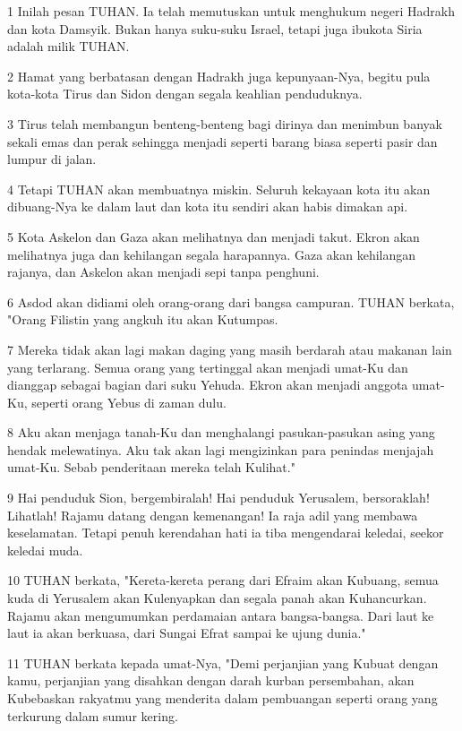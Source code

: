 \par 1 Inilah pesan TUHAN. Ia telah memutuskan untuk menghukum negeri Hadrakh dan kota Damsyik. Bukan hanya suku-suku Israel, tetapi juga ibukota Siria adalah milik TUHAN.
\par 2 Hamat yang berbatasan dengan Hadrakh juga kepunyaan-Nya, begitu pula kota-kota Tirus dan Sidon dengan segala keahlian penduduknya.
\par 3 Tirus telah membangun benteng-benteng bagi dirinya dan menimbun banyak sekali emas dan perak sehingga menjadi seperti barang biasa seperti pasir dan lumpur di jalan.
\par 4 Tetapi TUHAN akan membuatnya miskin. Seluruh kekayaan kota itu akan dibuang-Nya ke dalam laut dan kota itu sendiri akan habis dimakan api.
\par 5 Kota Askelon dan Gaza akan melihatnya dan menjadi takut. Ekron akan melihatnya juga dan kehilangan segala harapannya. Gaza akan kehilangan rajanya, dan Askelon akan menjadi sepi tanpa penghuni.
\par 6 Asdod akan didiami oleh orang-orang dari bangsa campuran. TUHAN berkata, "Orang Filistin yang angkuh itu akan Kutumpas.
\par 7 Mereka tidak akan lagi makan daging yang masih berdarah atau makanan lain yang terlarang. Semua orang yang tertinggal akan menjadi umat-Ku dan dianggap sebagai bagian dari suku Yehuda. Ekron akan menjadi anggota umat-Ku, seperti orang Yebus di zaman dulu.
\par 8 Aku akan menjaga tanah-Ku dan menghalangi pasukan-pasukan asing yang hendak melewatinya. Aku tak akan lagi mengizinkan para penindas menjajah umat-Ku. Sebab penderitaan mereka telah Kulihat."
\par 9 Hai penduduk Sion, bergembiralah! Hai penduduk Yerusalem, bersoraklah! Lihatlah! Rajamu datang dengan kemenangan! Ia raja adil yang membawa keselamatan. Tetapi penuh kerendahan hati ia tiba mengendarai keledai, seekor keledai muda.
\par 10 TUHAN berkata, "Kereta-kereta perang dari Efraim akan Kubuang, semua kuda di Yerusalem akan Kulenyapkan dan segala panah akan Kuhancurkan. Rajamu akan mengumumkan perdamaian antara bangsa-bangsa. Dari laut ke laut ia akan berkuasa, dari Sungai Efrat sampai ke ujung dunia."
\par 11 TUHAN berkata kepada umat-Nya, "Demi perjanjian yang Kubuat dengan kamu, perjanjian yang disahkan dengan darah kurban persembahan, akan Kubebaskan rakyatmu yang menderita dalam pembuangan seperti orang yang terkurung dalam sumur kering.
